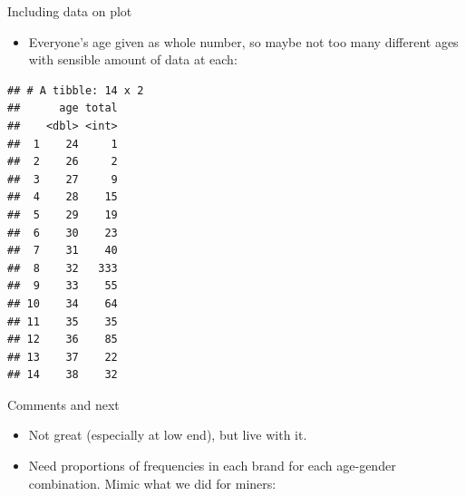 \documentclass[ignorenonframetext,]{beamer}
\newenvironment{Shaded}{\begin{snugshade}}{\end{snugshade}}
\newcommand{\DataTypeTok}[1]{\textcolor[rgb]{0.13,0.29,0.53}{#1}}
\newcommand{\KeywordTok}[1]{\textcolor[rgb]{0.13,0.29,0.53}{\textbf{#1}}}
\newcommand{\NormalTok}[1]{#1}
\newcommand{\OperatorTok}[1]{\textcolor[rgb]{0.81,0.36,0.00}{\textbf{#1}}}
\newcommand{\StringTok}[1]{\textcolor[rgb]{0.31,0.60,0.02}{#1}}
\providecommand{\tightlist}{%
  \setlength{\itemsep}{0pt}\setlength{\parskip}{0pt}}
\begin{document}
\begin{frame}[fragile]{Including data on plot}
\protect\hypertarget{including-data-on-plot}{}

\begin{itemize}
\tightlist
\item
  Everyone's age given as whole number, so maybe not too many different
  ages with sensible amount of data at each:
\end{itemize}

\scriptsize

\begin{Shaded}
\end{Shaded}

\begin{verbatim}
## # A tibble: 14 x 2
##      age total
##    <dbl> <int>
##  1    24     1
##  2    26     2
##  3    27     9
##  4    28    15
##  5    29    19
##  6    30    23
##  7    31    40
##  8    32   333
##  9    33    55
## 10    34    64
## 11    35    35
## 12    36    85
## 13    37    22
## 14    38    32
\end{verbatim}

\normalsize

\end{frame}

\begin{frame}[fragile]{Comments and next}
\protect\hypertarget{comments-and-next}{}

\begin{itemize}
\item
  Not great (especially at low end), but live with it.
\item
  Need proportions of frequencies in each brand for each age-gender
  combination. Mimic what we did for miners:
\end{itemize}

\begin{Shaded}
\end{Shaded}

\end{frame}
\end{document}
